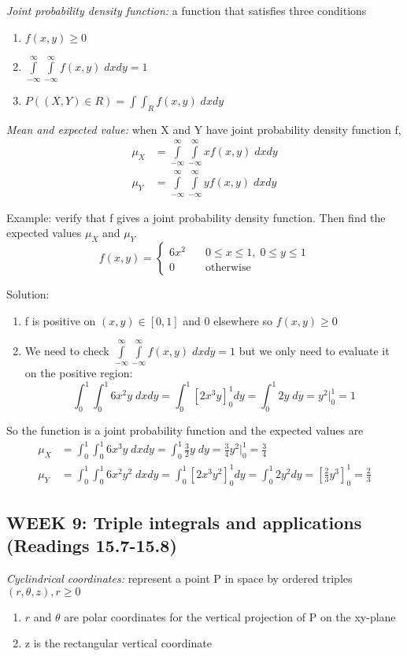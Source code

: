\documentclass[12pt]{article}
\begin{document}
\emph{Joint probability density function:} a function that satisfies three conditions
\begin{enumerate}
    \item $f(x,y) \geq 0$
    \item $\int\limits_{-\infty}^\infty \int\limits_{-\infty}^\infty f(x,y) \; dx dy = 1$
    \item $P((X, Y) \in R) = \int \int_R f(x,y) \; dx dy$
\end{enumerate}

\emph{Mean and expected value:} when X and Y have joint probability density function f,
\begin{align*}
    \mu_X &= \int\limits_{-\infty}^\infty \int\limits_{-\infty}^\infty x f(x,y) \; dx dy\\
    \mu_Y &= \int\limits_{-\infty}^\infty \int\limits_{-\infty}^\infty y f(x,y) \; dx dy
\end{align*}

Example: verify that f gives a joint probability density function. Then find the expected values $\mu_X$ and $\mu_Y$
\[f(x,y) = \begin{cases}
    6x^2 \quad &0 \leq x \leq 1,\; 0\leq y \leq 1\\
    0 \quad &\text{otherwise}
\end{cases}
\]

Solution:
\begin{enumerate}
    \item f is positive on $(x,y) \in [0, 1]$ and 0 elsewhere so $f(x,y) \geq 0$
    \item We need to check $\int\limits_{-\infty}^\infty \int\limits_{-\infty}^\infty f(x,y) \; dx dy = 1$ but we only need to evaluate it on the positive region:
    \[\int_0^1 \int_0^1 6x^2 y \; dx dy= \int_0^1 \left[2x^3 y\right]_0^1 dy = \int_0^1 2y \; dy=y^2 \big|_0^1 = 1\]
\end{enumerate}
So the function is a joint probability function and the expected values are
\begin{align*}
    \mu_X &= \int_0^1 \int_0^1 6x^3 y \; dx dy = \int_0^1 \frac{3}{2} y \; dy = \frac{3}{4} y^2 \big|_0^1 = \frac{3}{4}\\
    \mu_Y &= \int_0^1 \int_0^1 6x^2 y^2 \; dx dy = \int_0^1 \left[2x^3 y^2\right]_0^1 dy = \int_0^1 2y^2 dy = \left[\frac{2}{3} y^3\right]_0 ^1 = \frac{2}{3}
\end{align*}
\subsection{WEEK 9: Triple integrals and applications (Readings 15.7-15.8)}
\emph{Cyclindrical coordinates:} represent a point P in space by ordered triples $(r, \theta, z), r \geq 0$
\begin{enumerate}
    \item $r$ and $\theta$ are polar coordinates for the vertical projection of P on the xy-plane
    \item z is the rectangular vertical coordinate
\end{enumerate}
\end{document}
